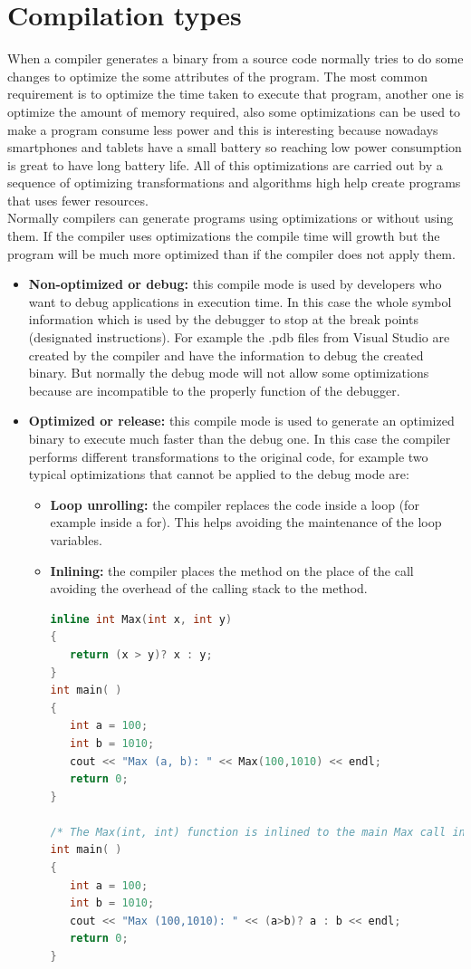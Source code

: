 \section{Compilation types}\label{S:PERF-comptypes}
When a compiler generates a binary from a source code normally tries to do some changes to optimize the some attributes of the program. The most common requirement is to optimize the time taken to execute that program, another one is optimize the amount of memory required, also some optimizations can be used to make a program consume less power and this is interesting because nowadays smartphones and tablets have a small battery so reaching low power consumption is great to have long battery life. All of this optimizations are carried out by a sequence of optimizing transformations and algorithms high help create programs that uses fewer resources.
\\
Normally compilers can generate programs using optimizations or without using them. If the compiler uses optimizations the compile time will growth but the program will be much more optimized than if the compiler does not apply them.
\begin{itemize}
  \item \textbf{Non-optimized or debug:} this compile mode is used by developers who want to debug applications in execution time. In this case the whole symbol information which is used by the debugger to stop at the break points (designated instructions). For example the .pdb files from Visual Studio are created by the compiler and have the information to debug the created binary. But normally the debug mode will not allow some optimizations because are incompatible to the properly function of the debugger.
  \item \textbf{Optimized or release:} this compile mode is used to generate an optimized binary to execute much faster than the debug one. In this case the compiler performs different transformations to the original code, for example two typical optimizations that cannot be applied to the debug mode are:
  \begin{itemize}
  	\item \textbf{Loop unrolling:} the compiler replaces the code inside a loop (for example inside a for). This helps avoiding the maintenance of the loop variables.
  	\item \textbf{Inlining:} the compiler places the method on the place of the call avoiding the overhead of the calling stack to the method.
  	\begin{lstlisting}[language=C++, caption={Inline example}]
inline int Max(int x, int y)
{
   return (x > y)? x : y;
}
int main( )
{
   int a = 100;
   int b = 1010;
   cout << "Max (a, b): " << Max(100,1010) << endl;
   return 0;
}

/* The Max(int, int) function is inlined to the main Max call in the following way:*/
int main( )
{
   int a = 100;
   int b = 1010;
   cout << "Max (100,1010): " << (a>b)? a : b << endl;
   return 0;
}
\end{lstlisting}
  \end{itemize}
\end{itemize}

